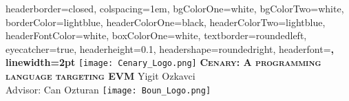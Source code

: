 \documentclass[landscape,a1paper,fontscale=0.485]{baposter} %
\begin{document}
\begin{poster}
{
headerborder=closed, %
colspacing=1em, %
bgColorOne=white, %
bgColorTwo=white, %
borderColor=lightblue, %
headerColorOne=black, %
headerColorTwo=lightblue, %
headerFontColor=white, %
boxColorOne=white, %
textborder=roundedleft, %
eyecatcher=true, %
headerheight=0.1\textheight, %
headershape=roundedright, %
headerfont=\Large\bf\textsc, %
linewidth=2pt %
}
%
{\texttt{[image: Cenary\_Logo.png]}} %
{\bf\textsc{Cenary: A programming language targeting EVM}\vspace{0.5em}} %
{ Yigit Ozkavci \\\hspace{12pt} Advisor: Can Ozturan } %
{\texttt{[image: Boun\_Logo.png]}} %


\end{poster}
\end{document}
